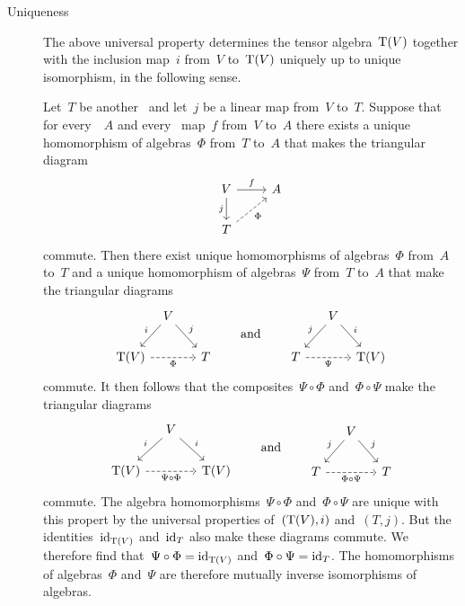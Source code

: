 \begin{recall}
\begin{description}
		\item[Uniqueness]
			The above universal property determines the tensor algebra~$\operatorname{T}(V)$ together with the inclusion map~$i$ from~$V$ to~$\operatorname{T}(V)$ uniquely up to unique isomorphism, in the following sense.

			Let~$T$ be another~{\algebra{$\kf$}} and let~$j$ be a linear map from~$V$ to~$T$.
			Suppose that for every~{\algebra{$\kf$}}~$A$ and every~{\linear{$\kf$}} map~$f$ from~$V$ to~$A$ there exists a unique homomorphism of algebras~$\Phi$ from~$T$ to~$A$ that makes the triangular diagram
			\[
				\begin{tikzcd}
					V
					\arrow{r}[above]{f}
					\arrow{d}[left]{j}
					&
					A
					\\
					T
					\arrow[dashed]{ur}[below right]{\Phi}
					&
					{}
				\end{tikzcd}
			\]
			commute.
			Then there exist unique homomorphisms of algebras~$\Phi$ from~$A$ to~$T$ and a unique homomorphism of algebras~$\Psi$ from~$T$ to~$A$ that make the triangular diagrams
			\[
				\begin{tikzcd}[column sep = {3em,between origins}]
					{}
					&
					V
					\arrow{dl}[above left]{i}
					\arrow{dr}[above right]{j}
					&
					{}
					\\
					\Tensor(V)
					\arrow[dashed]{rr}[below]{\Phi}
					&
					{}
					&
					T
				\end{tikzcd}
				\qquad\text{and}\qquad
				\begin{tikzcd}[column sep = {3em,between origins}]
					{}
					&
					V
					\arrow{dl}[above left]{j}
					\arrow{dr}[above right]{i}
					&
					{}
					\\
					T
					\arrow[dashed]{rr}[below]{\Psi}
					&
					{}
					&
					\Tensor(V)
				\end{tikzcd}
			\]
			commute.
			It then follows that the composites~$\Psi \circ \Phi$ and~$\Phi \circ \Psi$ make the triangular diagrams
			\[
				\begin{tikzcd}[column sep = small]
					{}
					&
					V
					\arrow{dl}[above left]{i}
					\arrow{dr}[above right]{i}
					&
					{}
					\\
					\Tensor(V)
					\arrow[dashed]{rr}[below]{\Psi \circ \Phi}
					&
					{}
					&
					\Tensor(V)
				\end{tikzcd}
				\qquad\text{and}\qquad
				\begin{tikzcd}[column sep = small]
					{}
					&
					V
					\arrow{dl}[above left]{j}
					\arrow{dr}[above right]{j}
					&
					{}
					\\
					T
					\arrow[dashed]{rr}[below]{\Phi \circ \Psi}
					&
					{}
					&
					T
				\end{tikzcd}
			\]
			commute.
			The algebra homomorphisms~$\Psi \circ \Phi$ and~$\Phi \circ \Psi$ are unique with this propert by the universal properties of~$(\operatorname{T}(V), i)$ and~$(T, j)$.
			But the identities~$\mathrm{id}_{\operatorname{T}(V)}$ and~$\mathrm{id}_T$ also make these diagrams commute.
			We therefore find that~$\Psi \circ \Phi = \mathrm{id}_{\operatorname{T}(V)}$ and~$\Phi \circ \Psi = \mathrm{id}_{T}$.
			The homomorphisms of algebras~$\Phi$ and~$\Psi$ are therefore mutually inverse isomorphisms of algebras.
		

\end{description}
\end{recall}
